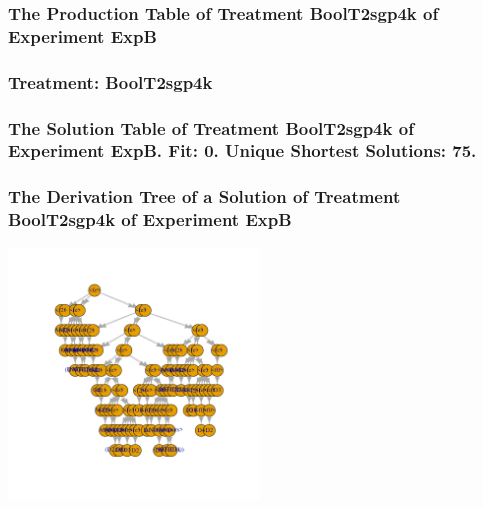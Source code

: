 \documentclass[18pt,c]{beamer}
\begin{document}
 \begin{frame}
 \fontsize{8pt}{9pt}\selectfont
 \frametitle{ The Production Table of Treatment BoolT2sgp4k of Experiment ExpB }

 \label{ExpBGrammarTable013.tex}  
 \end{frame}

 \begin{frame}
 \fontsize{8pt}{9pt}\selectfont
 \frametitle{ Treatment: BoolT2sgp4k }

 \label{ExpBStatsTable019.tex}  
 \end{frame}

 \begin{frame}
 \fontsize{8pt}{9pt}\selectfont
 \frametitle{ The Solution Table of Treatment BoolT2sgp4k of Experiment ExpB. Fit: 0. Unique Shortest Solutions: 75. }

 \label{ExpBSolutionTable012.tex}  
 \end{frame}

 \begin{frame}
 \frametitle{ The Derivation Tree of a Solution of Treatment BoolT2sgp4k of Experiment ExpB }
 \begin{center}
\includegraphics[width=0.5\textwidth, angle=0]
{ExpBDerivationTreeFigure012.pdf}
 \end{center}
 \label{report/ExpBDerivationTreeFigure012.pdf}  
 \end{frame}
\end{document}
